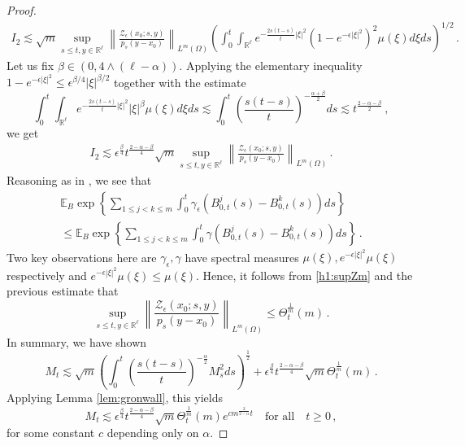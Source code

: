 \documentclass[12pt,reqno]{amsart}
\theoremstyle{remark}
\newcommand{\1}{\mathbf{1}}
\def\RR{\mathbb{R}}
\def\EE{\mathbb{E}}
\def\Z{\mathcal{Z}}
\def\lt{\left}
\def\rt{\right}
\begin{document}
\begin{proof}
\begin{align*}
			I_2\lesssim\sqrt{m} \sup_{s\le t,y\in\RR^\ell}\lt\|\frac{\Z_\epsilon(x_0;s,y)}{p_s(y-x_0)} \rt\|_{L^m(\Omega)} \left( \int_0^t \int_{\RR^\ell} e^{-\frac{2s(t-s)}{t} |\xi|^2}(1-e^{-\epsilon|\xi|^2})^2 \mu(\xi)d\xi  ds \right)^{1/2}\,.
		\end{align*}
		Let us fix $\beta\in(0,4\wedge(\ell- \alpha))$. Applying the elementary inequality $1-e^{-\epsilon|\xi|^2}\le \epsilon^{\beta/4}|\xi|^{\beta/2}$ together with the estimate
		\begin{equation*}
			\int_0^t\int_{\RR^\ell} e^{-\frac{2s(t-s)}{t} |\xi|^2}|\xi|^{\beta} \mu(\xi)d\xi ds\lesssim \int_0^t\lt(\frac{s(t-s)}t \rt)^{-\frac{\alpha+\beta}2}ds\lesssim t^{\frac{2- \alpha- \beta}2}\,,
		\end{equation*}
		we get
		\begin{align*}
			I_2\lesssim \epsilon^{\frac \beta 4} t^{\frac{2- \alpha-\beta}4}\sqrt m \sup_{s\le t,y\in\RR^\ell}\lt\|\frac{\Z_\epsilon(x_0;s,y)}{p_s(y-x_0)} \rt\|_{L^m(\Omega)}\,.
		\end{align*}
		Reasoning as in \cite[Lemma 4.1]{HLN15}, we see that
		\begin{multline*}
			\EE_B\exp\lt\{\sum_{1\le j<k\le m}\int_0^t \gamma_\epsilon(B^j_{0,t}(s)-B^k_{0,t}(s))ds \rt\}
			\\\le \EE_B\exp\lt\{\sum_{1\le j<k\le m}\int_0^t \gamma(B^j_{0,t}(s)-B^k_{0,t}(s))ds \rt\}\,.
		\end{multline*}
		Two key observations here are $\gamma_ \epsilon,\gamma$ have spectral measures $\mu(\xi),e^{-\epsilon|\xi|^2}\mu(\xi)$ respectively and $e^{-\epsilon|\xi|^2}\mu(\xi)\le \mu(\xi)$. Hence, it follows from \eqref{h1:supZm} and the previous estimate that
		\begin{equation*}
			\sup_{s\le t,y\in\RR^\ell}\lt\|\frac{\Z_\epsilon(x_0;s,y)}{p_s(y-x_0)} \rt\|_{L^m(\Omega)}\le 
			\Theta_t^{\frac1m}(m)\,.
		\end{equation*}
		In summary, we have shown
		\begin{equation*}
			M_t\lesssim \sqrt m\lt(\int_0^t\lt(\frac{s(t-s)}t \rt)^{-\frac \alpha2}M_s^2 ds \rt)^{\frac12}+\epsilon^{\frac \beta4}t^{\frac{2- \alpha -\beta}4}\sqrt m \Theta_t^{\frac1m}(m)\,.
		\end{equation*}
		Applying Lemma \ref{lem:gronwall}, this yields
		\begin{equation}
			M_t\lesssim \epsilon^{\frac \beta4}t^{\frac{2- \alpha-\beta}4}\sqrt m \Theta_t^{\frac1m}(m)e^{cm^{\frac2{2- \alpha}}t}\quad\mbox{for all}\quad t\ge0\,,
		\end{equation}
		for some constant $c$ depending only on $\alpha$.
	\end{proof}
	
\end{document}
